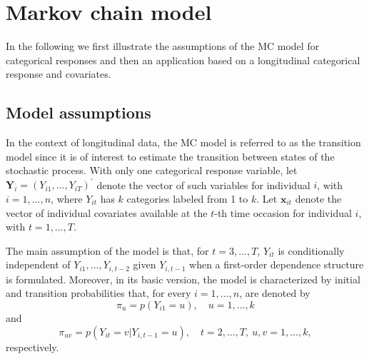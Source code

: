 \hypertarget{sec:MCmod}{%
\section{Markov chain model}\label{sec:MCmod}}

In the following we first illustrate the assumptions of the MC model for
categorical responses and then an application based on a longitudinal
categorical response and covariates.

\hypertarget{subsec:MCassump}{%
\subsection{Model assumptions}\label{subsec:MCassump}}

In the context of longitudinal data, the MC model is referred to as
the transition model \citep{anderson:54} since it is
of interest to estimate the transition between states of the stochastic
process. With only one categorical response variable, let
\(\mathbf{Y}_{i} = (Y_{i1},\ldots,Y_{iT})^\prime\) denote the vector of
such variables for individual \(i\), with \(i=1,\ldots,n\), where \(Y_{it}\)
has \(k\) categories labeled from 1 to \(k\). Let \(\boldsymbol{x}_{it}\) denote the
vector of individual covariates available at the \(t\)-th time occasion
for individual \(i\), with \(t=1,\ldots,T\).

The main assumption of the model is that, for \(t=3,\ldots,T\), \(Y_{it}\)
is conditionally independent of \(Y_{i1}, \ldots, Y_{i,t-2}\) given
\(Y_{i,t-1}\) when a first-order dependence structure is formulated.
Moreover, in its basic version, the model is characterized by initial
and transition probabilities that, for every \(i = 1,\ldots, n\), are
denoted by \[
\pi_{u} = p(Y_{i1} = u),  \quad u = 1,\ldots,k
\] and \[
\pi_{uv} = p(Y_{it} = v | Y_{i,t-1}= u),\quad t=2,\ldots,T,\: u,v=1,\ldots,k,
\] respectively.


